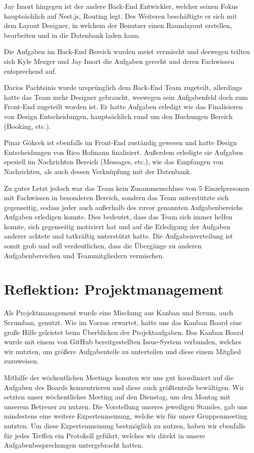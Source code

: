 Jay Imort hingegen ist der andere Back-End Entwickler, welcher seinen Fokus hauptsächlich auf Nest.js, Routing legt.
Des Weiteren beschäftigte er sich mit dem Layout Designer, in welchem der Benutzer einen Raumlayout erstellen, bearbeiten und in die Datenbank laden kann.

Die Aufgaben im Back-End Bereich wurden meist vermischt und deswegen teilten sich Kyle Mezger und Jay Imort die Aufgaben gerecht und deren Fachwissen entsprechend auf.

Darios Pachtsinis wurde ursprünglich dem Back-End Team zugeteilt, allerdings hatte das Team mehr Designer gebraucht, weswegen sein Aufgabenfeld doch zum Front-End zugeteilt worden ist.
Er hatte Aufgaben erledigt wie das Finalisieren von Design Entscheidungen, hauptsächlich rund um den Buchungen Bereich (Booking, etc.).

Pinar Gökcek ist ebenfalls im Front-End zuständig gewesen und hatte Design Entscheidungen von Rico Hofmann finalisiert.
Außerdem erledigte sie Aufgaben speziell im Nachrichten Bereich (Messages, etc.), wie das Empfangen von Nachrichten, als auch dessen Verknüpfung mit der Datenbank.

Zu guter Letzt jedoch war das Team kein Zusammenschluss von 5 Einzelpersonen mit Fachwissen in besonderen Bereich, sondern das Team unterstützte sich gegenseitig, sodass jeder auch außerhalb des zuvor genannten Aufgabenbereichs Aufgaben erledigen konnte.
Dies bedeutet, dass das Team sich immer helfen konnte, sich gegenseitig motiviert hat und auf die Erledigung der Aufgaben anderer achtete und tatkräftig unterstützt hatte.
Die Aufgabenverteilung ist somit grob und soll verdeutlichen, dass die Übergänge zu anderen Aufgabenbereichen und Teammitgliedern vermischen.

\section{Reflektion: Projektmanagement}

Als Projektmanagement wurde eine Mischung aus Kanban und Scrum, auch Scrumban, genutzt.
Wie im Voraus erwartet, hatte uns das Kanban Board eine große Hilfe geleistet beim Überblicken der Projektaufgaben.
Das Kanban Board wurde mit einem von GitHub bereitgestellten Issue-System verbunden, welches wir nutzten, um größere Aufgabenteile zu unterteilen und diese einem Mitglied zuzuweisen.

Mithilfe der wöchentlichen Meetings konnten wir uns gut koordiniert auf die Aufgaben des Boards konzentrieren und diese auch größtenteils bewältigen.
Wir setzten unser wöchentliches Meeting auf den Dienstag, um den Montag mit unserem Betreuer zu nutzen.
Die Vorstellung unseres jeweiligen Standes, gab uns mindestens eine weitere Expertenmeinung, welche wir für unser Gruppenmeeting nutzten.
Um diese Expertenmeinung bestmöglich zu nutzen, haben wir ebenfalls für jedes Treffen ein Protokoll geführt, welches wir direkt in unsere Aufgabenbesprechungen untergebracht hatten.


